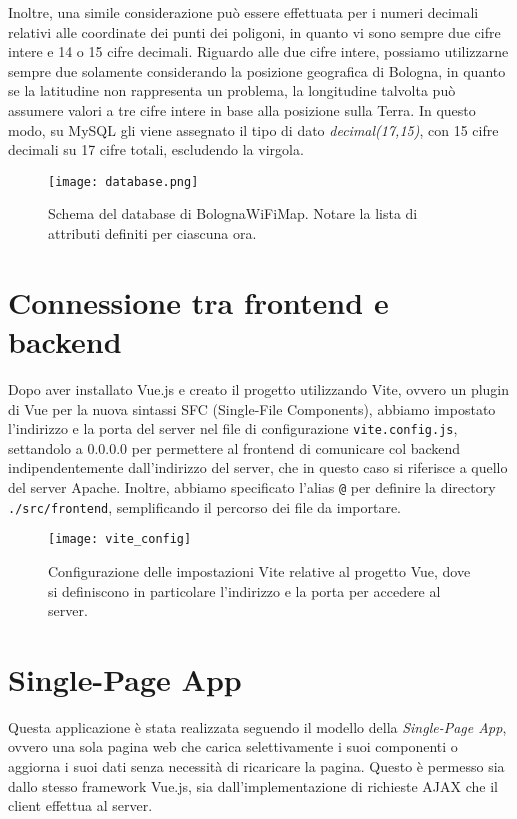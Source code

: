 Inoltre, una simile considerazione può essere effettuata per i numeri decimali relativi alle coordinate dei punti dei poligoni, in quanto vi sono sempre due cifre intere e 14 o 15 cifre decimali. Riguardo alle due cifre intere, possiamo utilizzarne sempre due solamente considerando la posizione geografica di Bologna, in quanto se la latitudine non rappresenta un problema, la longitudine talvolta può assumere valori a tre cifre intere in base alla posizione sulla Terra. In questo modo, su MySQL gli viene assegnato il tipo di dato \textit{decimal(17,15)}, con 15 cifre decimali su 17 cifre totali, escludendo la virgola.

\begin{figure}[H]
    \centering
    \texttt{[image: database.png]}
    \caption[Schema del database]{Schema del database di BolognaWiFiMap. Notare la lista di attributi definiti per ciascuna ora.}
    \label{fig:database}
\end{figure}

\section{Connessione tra frontend e backend}
Dopo aver installato Vue.js e creato il progetto utilizzando Vite, ovvero un plugin di Vue per la nuova sintassi SFC (Single-File Components), abbiamo impostato l'indirizzo e la porta del server nel file di configurazione \Verb_vite.config.js_, settandolo a 0.0.0.0 per permettere al frontend di comunicare col backend indipendentemente dall'indirizzo del server, che in questo caso si riferisce a quello del server Apache. Inoltre, abbiamo specificato l'alias \Verb_@_ per definire la directory \Verb_./src/frontend_, semplificando il percorso dei file da importare.

\begin{figure}[H]
    \centering
    \texttt{[image: vite\_config]}
    \caption[Configurazione delle impostazioni Vite]{Configurazione delle impostazioni Vite relative al progetto Vue, dove si definiscono in particolare l'indirizzo e la porta per accedere al server.}
    \label{fig:vite_config}
\end{figure}

\section{Single-Page App}
Questa applicazione è stata realizzata seguendo il modello della \textit{Single-Page App}, ovvero una sola pagina web che carica selettivamente i suoi componenti o aggiorna i suoi dati senza necessità di ricaricare la pagina. Questo è permesso sia dallo stesso framework Vue.js, sia dall'implementazione di richieste AJAX che il client effettua al server.

